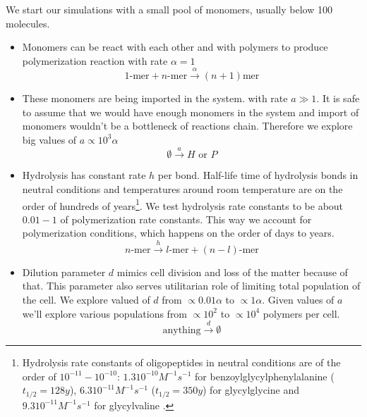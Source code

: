 \documentclass[journal=jacsat,manuscript=article,layout=twocolumn]{achemso}
\newcommand*{\ga}{\alpha}
\begin{document}
We start our simulations with a small pool of monomers, usually below 100 molecules. 
\begin{itemize}
 \item Monomers can be react with each other and with polymers to produce polymerization reaction 
with rate 
$\ga = 1$
\begin{equation}
 1\mbox{-mer}+n\mbox{-mer} \xrightarrow{\ga} (n+1)\mbox{mer}
\end{equation}
\item These monomers are being imported in the system. with rate $a\gg1$. It is safe to assume that 
we would have enough monomers in the system and import of monomers wouldn't be a bottleneck of 
reactions chain. Therefore we explore big values of $a\propto 10^3\ga$
\begin{equation}
 \emptyset \xrightarrow{a} H\,\,\mbox{or}\,\,P
\end{equation}

\item Hydrolysis has constant rate $h$ per bond. Half-life time of hydrolysis bonds in neutral 
conditions and temperatures around room temperature are on the order of hundreds of 
years\footnote{Hydrolysis rate constants of oligopeptides in 
neutral conditions are of the order of $10^{-11}-10^{-10}$: $1.3  10^{-10} M^{-1}s^{-1} $ 
for benzoylglycylphenylalanine ($t_{1/2} = 128 y$)\cite{Bryant1996}, $6.3  10^{-11} M^{-1} s^{-1}$
($t_{1/2}=350 y$) for glycylglycine and $9.3 10^{-11}M^{-1} s^{-1}$ for glycylvaline
\cite{Smith1998}.}. We test hydrolysis rate constants to be about $0.01-1$ of polymerization rate 
constants. This way we account for polymerization conditions, which happens on the order of days 
to years.
\begin{equation}
 n\mbox{-mer} \xrightarrow{h} l\mbox{-mer}+(n-l)\mbox{-mer}
\end{equation}



\item Dilution parameter $d$ mimics cell division and loss of the matter because of that. 
This parameter also serves utilitarian role of limiting total population of the cell. We explore 
valued of $d$ from $\propto 0.01\ga$ to $\propto 1\ga$. Given values of $a$ we'll explore various 
populations from $\propto 10^2$ to $\propto 10^4$ polymers per 
cell.
\begin{equation}
 \mbox{anything} \xrightarrow{d}\emptyset
\end{equation}



\end{itemize}
\end{document}
